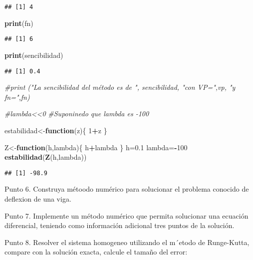 \documentclass[]{article}
\newenvironment{Shaded}{\begin{snugshade}}{\end{snugshade}}
\newcommand{\KeywordTok}[1]{\textcolor[rgb]{0.13,0.29,0.53}{\textbf{#1}}}
\newcommand{\DecValTok}[1]{\textcolor[rgb]{0.00,0.00,0.81}{#1}}
\newcommand{\FloatTok}[1]{\textcolor[rgb]{0.00,0.00,0.81}{#1}}
\newcommand{\CommentTok}[1]{\textcolor[rgb]{0.56,0.35,0.01}{\textit{#1}}}
\newcommand{\ControlFlowTok}[1]{\textcolor[rgb]{0.13,0.29,0.53}{\textbf{#1}}}
\newcommand{\OperatorTok}[1]{\textcolor[rgb]{0.81,0.36,0.00}{\textbf{#1}}}
\newcommand{\NormalTok}[1]{#1}
\begin{document}
\begin{verbatim}
## [1] 4
\end{verbatim}

\begin{Shaded}
\begin{Highlighting}[]
\KeywordTok{print}\NormalTok{(fn)}
\end{Highlighting}
\end{Shaded}

\begin{verbatim}
## [1] 6
\end{verbatim}

\begin{Shaded}
\begin{Highlighting}[]
\KeywordTok{print}\NormalTok{(sencibilidad)}
\end{Highlighting}
\end{Shaded}

\begin{verbatim}
## [1] 0.4
\end{verbatim}

\begin{Shaded}
\begin{Highlighting}[]
\CommentTok{#print ("La sencibilidad del método es de ", sencibilidad, "con VP=",vp, "y fn=",fn)}

\CommentTok{#lambda<<0}
\CommentTok{#Suponinedo que lambda es -100}

\NormalTok{estabilidad<-}\ControlFlowTok{function}\NormalTok{(z)\{}
  \DecValTok{1}\OperatorTok{+}\NormalTok{z}
\NormalTok{\}}

\NormalTok{Z<-}\ControlFlowTok{function}\NormalTok{(h,lambda)\{}
\NormalTok{  h}\OperatorTok{+}\NormalTok{lambda}
\NormalTok{\}}
\NormalTok{h=}\FloatTok{0.1}
\NormalTok{lambda=}\OperatorTok{-}\DecValTok{100}
\KeywordTok{estabilidad}\NormalTok{(}\KeywordTok{Z}\NormalTok{(h,lambda))}
\end{Highlighting}
\end{Shaded}

\begin{verbatim}
## [1] -98.9
\end{verbatim}

Punto 6. Construya métoodo numérico para solucionar el problema conocido
de deflexion de una viga.

Punto 7. Implemente un método numérico que permita solucionar una
ecuación diferencial, teniendo como información adicional tres puntos de
la solución.

Punto 8. Resolver el sistema homogeneo utilizando el m´etodo de
Runge-Kutta, compare con la solución exacta, calcule el tamaño del
error:
\end{document}

